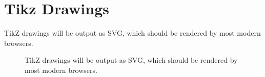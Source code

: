 \documentclass[graybox]{svmult}
\begin{document}
\section{Tikz Drawings}

TikZ drawings will be output as SVG, which should be rendered by most modern browsers.

\begin{figure}
\centering
{}
\caption{TikZ drawings will be output as SVG, which should be rendered by most modern browsers.}
\end{figure}



\end{document}
